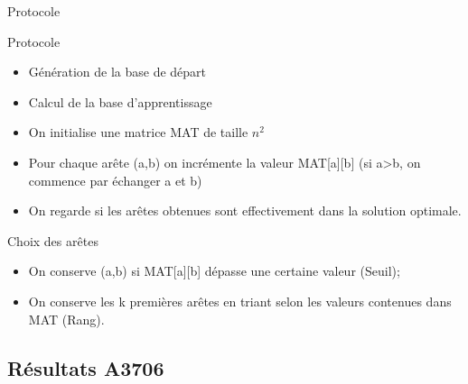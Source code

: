 \documentclass{beamer}
\begin{document}
\begin{frame}{Protocole}

\begin{exampleblock}{Protocole}
\begin{itemize}
\item Génération de la base de départ
\item Calcul de la base d'apprentissage
\item On initialise une matrice MAT de taille $n^2$
\item Pour chaque arête (a,b) on incrémente la valeur MAT[a][b] (si a>b, on commence par échanger a et b)
\item On regarde si les arêtes obtenues sont effectivement dans la solution optimale.
\end{itemize}
\end{exampleblock}

\begin{block}{Choix des arêtes}
\begin{itemize}
\item On conserve (a,b) si MAT[a][b] dépasse une certaine valeur (Seuil);
\item On conserve les k premières arêtes en triant selon les valeurs contenues dans MAT (Rang).
\end{itemize}
\end{block}

\end{frame}

\subsection{Résultats A3706}
\end{document}
